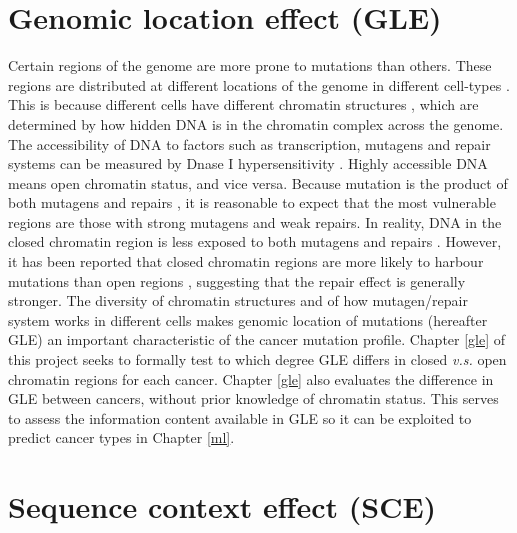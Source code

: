 \section{Genomic location effect (GLE)}
\label{intro:gle}
Certain regions of the genome are more prone to mutations than others. These regions are distributed at different locations of the genome in different cell-types \citep{Polak2015}. This is because different cells have different chromatin structures \citep{Abascal2020ExpandedGenomes}, which are determined by how hidden DNA is in the chromatin complex across the genome. The accessibility of DNA to factors such as transcription, mutagens and repair systems can be measured by Dnase I hypersensitivity \citep[DHS;][]{Liu2019AApplications}. Highly accessible DNA means open chromatin status, and vice versa. Because mutation is the product of both \glspl{mutagen} and repairs \citep{Ripley2001Mutation}, it is reasonable to expect that the most vulnerable regions are those with strong mutagens and weak repairs. In reality, DNA in the closed chromatin region is less exposed to both mutagens and repairs \citep[Figure \ref{fig:chromatin_demo};][]{Teng1997ExcisionSequences, Morse2002PhotoreactivationCerevisiae}. However, it has been reported that closed chromatin regions are more likely to harbour mutations than open regions \citep{Polak2015,Prendergast2007ChromatinGenome}, suggesting that the repair effect is generally stronger. The diversity of chromatin structures and of how mutagen/repair system works in different cells makes genomic location of mutations (hereafter GLE) an important characteristic of the cancer mutation profile. Chapter \ref{gle} of this project seeks to formally test to which degree GLE differs in closed \textit{v.s.} open chromatin regions for each cancer. Chapter \ref{gle} also evaluates the difference in GLE between cancers, without prior knowledge of chromatin status. This serves to assess the information content available in GLE so it can be exploited to predict cancer types in Chapter \ref{ml}.



\section{Sequence context effect (SCE)}
\label{intro:sce}


